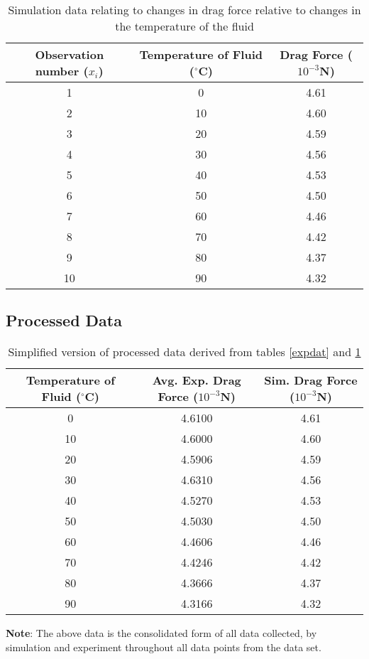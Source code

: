 	\begin{table}[H]
		\centering
		\begin{tabular}{|c|c|c|}
			\hline
			\hline
			{Observation number ($x_i$)} & {Temperature of Fluid ($^\circ$C)} & {Drag Force ($10^{-3}$N)} \\
			\hline
			\hline
			1 & 0 & 4.61 \\
			\hline
			2 & 10 & 4.60 \\
			\hline
			3 & 20 & 4.59 \\
			\hline
			4 & 30 & 4.56 \\
			\hline
			5 & 40 & 4.53 \\
			\hline
			6 & 50 & 4.50 \\
			\hline
			7 & 60 & 4.46 \\
			\hline
			8 & 70 & 4.42 \\
			\hline
			9 & 80 & 4.37 \\
			\hline
			10 & 90 & 4.32 \\
			\hline
			\hline
		\end{tabular}
		\caption{{Simulation data relating to changes in drag force relative to changes in the temperature of the fluid}}
		\label{simdat}
	\end{table}

\subsection{{Processed Data}}

	\begin{table}[H]
		\centering
		\begin{tabular}{|c|c|c|}
			\hline
			\hline
			{Temperature of Fluid ($^\circ$C)} & {Avg. Exp. Drag Force ($10^{-3}$N)} & {Sim. Drag Force ($10^{-3}$N)}\\
			\hline
			\hline
			0 & 4.6100 & 4.61 \\
			\hline
			10 & 4.6000 & 4.60 \\
			\hline
			20 & 4.5906 & 4.59 \\
			\hline
			30 & 4.6310 & 4.56 \\
			\hline
			40 & 4.5270 & 4.53 \\
			\hline
			50 & 4.5030 & 4.50 \\
			\hline
			60 & 4.4606 & 4.46 \\
			\hline
			70 & 4.4246 & 4.42 \\
			\hline
			80 & 4.3666 & 4.37 \\
			\hline
			90 & 4.3166 & 4.32 \\
			\hline
			\hline
		\end{tabular}
		\caption{{Simplified version of processed data derived from tables \ref{expdat} and \ref{simdat}}}
		
	\end{table}

	{\textbf{Note}: The above data is the consolidated form of all data collected, by simulation and experiment throughout all data points from the data set.}

